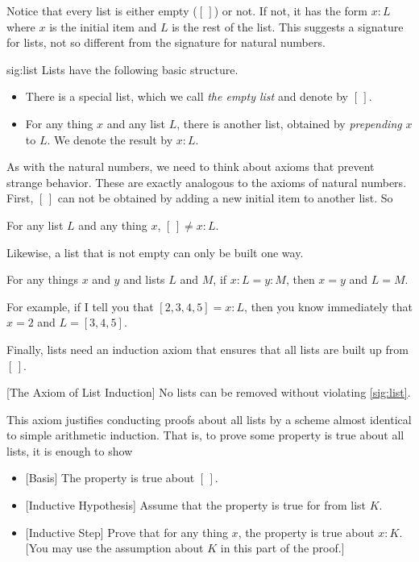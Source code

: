 Notice that every list is either empty ($[\,]$) or not. If not, it has
the form $x:L$ where $x$ is the initial item and $L$
is the rest of the list. This suggests a signature for lists, not so different from
the signature for natural numbers.

\begin{signature}{sig:list}
	Lists have the following basic structure.
	  \begin{itemize}
	  \item There is a special list, which we call \emph{the empty list} and denote by $[\,]$.
	  \item For any thing $x$ and any list $L$, there is another list, obtained by \emph{prepending} $x$ to $L$. We denote
	  the result by $x:L$.
	  \end{itemize}
\end{signature}

As with the natural numbers, we need to think about axioms that prevent strange behavior. These are exactly analogous to the
axioms of natural numbers. First, $[\,]$ can not be obtained by adding a new initial item to another list. So

\begin{axiom}
	For any list $L$ and any thing $x$, $[\,]\neq x:L$.
\end{axiom}

Likewise, a list that is not empty can only be built one way.

\begin{axiom}
	For any things $x$ and $y$ and lists $L$ and $M$, if $x:L = y:M$, then $x=y$ and $L=M$.
\end{axiom}

For example, if I tell you that $[2,3,4,5] = x:L$, then you know immediately that $x=2$ and $L=[3,4,5]$.

Finally, lists need an induction axiom that ensures that all lists are built up from $[\,]$.


\begin{axiom}\label{ax:NatInd}
	[The Axiom of List Induction] No lists can be removed without violating \ref{sig:list}.
\end{axiom}

This axiom justifies conducting proofs about all lists by a scheme almost identical to simple arithmetic induction.
That is, to prove some property is true about all lists, it is enough to show
\begin{itemize}
\item{}[Basis] The property is true about $[\,]$.
\item{}[Inductive Hypothesis] Assume that the property is true for from list $K$.
\item{}[Inductive Step] Prove that for any thing $x$, the property is true about $x:K$. [You may use the
  assumption about $K$ in this part of the proof.]
\end{itemize}

